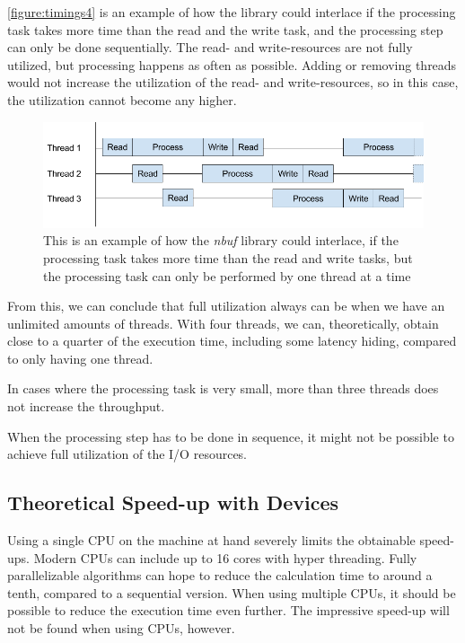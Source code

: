 \documentclass[a4paper]{article}
\newcommand{\nbuf}{\textit{nbuf} }
\begin{document}
\autoref{figure:timings4} is an example of how the library could interlace if the processing task takes more time than the read and the write task, and the processing step can only be done sequentially. The read- and write-resources are not fully utilized, but processing happens as often as possible. Adding or removing threads would not increase the utilization of the read- and write-resources, so in this case, the utilization cannot become any higher.\\

\begin{figure}
	\begin{adjustwidth}{-0.5in}{-0.5in}
    \centering
     \includegraphics[scale=0.5]{figures/timings4.png}
  	\caption{This is an example of how the \nbuf library could interlace, if the processing task takes more time than the read and write tasks, but the processing task can only be performed by one thread at a time}
	\label{figure:timings4}
	\end{adjustwidth}
\end{figure}


From this, we can conclude that full utilization always can be when we have an unlimited amounts of threads. With four threads, we can, theoretically, obtain close to a quarter of the execution time, including some latency hiding, compared to only having one thread. 

In cases where the processing task is very small, more than three threads does not increase the throughput.

When the processing step has to be done in sequence, it might not be possible to achieve full utilization of the I/O resources.


\subsection{Theoretical Speed-up with Devices}
Using a single CPU on the machine at hand severely limits the obtainable speed-ups. Modern CPUs can include up to 16 cores with hyper threading. Fully parallelizable algorithms can hope to reduce the calculation time to around a tenth, compared to a sequential version. When using multiple CPUs, it should be possible to reduce the execution time even further. The impressive speed-up will not be found when using CPUs, however.\\
\end{document}
